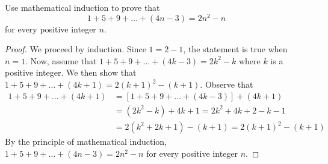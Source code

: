 \documentclass[12pt]{article}
\newenvironment{problem}[2][Problem]{\begin{trivlist}
		\item[\hskip \labelsep {\bfseries #1}\hskip \labelsep {\bfseries #2.}]}{\end{trivlist}}
\begin{document}
\begin{problem}{5}
	Use mathematical induction to prove that
	\begin{equation*}
		1+5+9+\ldots+(4n-3)=2n^{2}-n
	\end{equation*}
	for every positive integer $n$.
\begin{proof}
	We proceed by induction. Since $1=2-1$, the statement is true when $n=1$. Now, assume that $1+5+9+\ldots+(4k-3)=2k^{2}-k$ where $k$ is a positive integer. We then show that $1+5+9+\ldots+(4k+1)=2(k+1)^{2}-(k+1)$. Observe that
	\begin{align*}
	 1+5+9+\ldots+(4k+1)&= [1+5+9+\ldots+(4k-3)]+(4k+1) \\
	 &= (2k^{2}-k)+4k+1 = 2k^{2}+4k+2-k-1\\
	 &= 2(k^{2}+2k+1)-(k+1) = 2(k+1)^{2}-(k+1)
 	\end{align*}
 By the principle of mathematical induction, 	$1+5+9+\ldots+(4n-3)=2n^{2}-n$ for every positive integer $n$.
\end{proof}
\end{problem}
\end{document}
